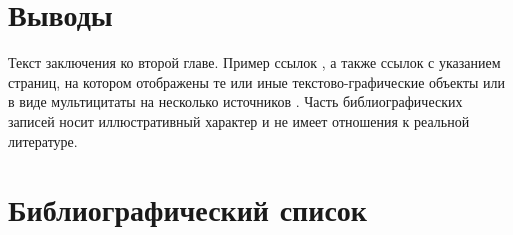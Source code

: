 \begin{refsection}









\section*{Выводы} \label{ch-11:conclusion}

Текст заключения ко второй главе. Пример ссылок \cite{Article,Book,Booklet,Conference,Inbook,Incollection,Manual,Mastersthesis,Misc,Phdthesis,Proceedings,Techreport,Unpublished,badiou:briefings}, а также ссылок с указанием страниц, на котором отображены те или иные текстово-графические объекты  \cite[с.~96]{Naidenova2017} или в виде мультицитаты на несколько источников \cites[с.~96]{Naidenova2017}[с.~46]{Ganter1999}. Часть библиографических записей носит иллюстративный характер и не имеет отношения к реальной литературе.


\section*{Библиографический список}
\FloatBarrier %


	
\printbibliography
\end{refsection}  
\newpage %